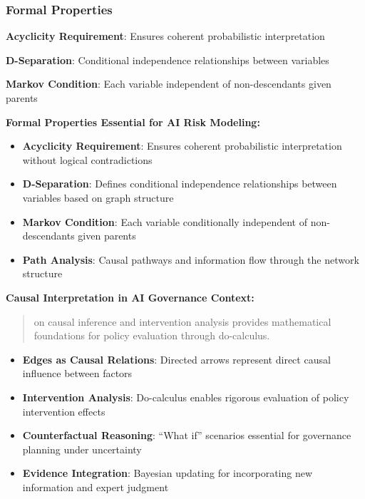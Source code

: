 \documentclass[
  11pt,
  letterpaper,
]{book}
\providecommand{\tightlist}{%
  \setlength{\itemsep}{0pt}\setlength{\parskip}{0pt}}
\begin{document}
\subsubsection{Formal Properties}\label{sec-formal-properties}

\textbf{Acyclicity Requirement}: Ensures coherent probabilistic
interpretation

\textbf{D-Separation}: Conditional independence relationships between
variables

\textbf{Markov Condition}: Each variable independent of non-descendants
given parents

\textbf{Formal Properties Essential for AI Risk Modeling:}

\begin{itemize}
\tightlist
\item
  \textbf{Acyclicity Requirement}: Ensures coherent probabilistic
  interpretation without logical contradictions
\item
  \textbf{D-Separation}: Defines conditional independence relationships
  between variables based on graph structure
\item
  \textbf{Markov Condition}: Each variable conditionally independent of
  non-descendants given parents
\item
  \textbf{Path Analysis}: Causal pathways and information flow through
  the network structure
\end{itemize}

\textbf{Causal Interpretation in AI Governance Context:}

\begin{quote}
\textcite{pearl2009} on causal inference and intervention analysis
provides mathematical foundations for policy evaluation through
do-calculus.
\end{quote}

\begin{itemize}
\tightlist
\item
  \textbf{Edges as Causal Relations}: Directed arrows represent direct
  causal influence between factors
\item
  \textbf{Intervention Analysis}: Do-calculus enables rigorous
  evaluation of policy intervention effects
\item
  \textbf{Counterfactual Reasoning}: ``What if'' scenarios essential for
  governance planning under uncertainty
\item
  \textbf{Evidence Integration}: Bayesian updating for incorporating new
  information and expert judgment
\end{itemize}
\end{document}
